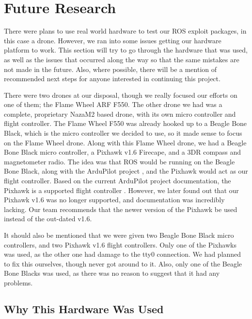 \documentclass[IEEEtran,letterpaper,10pt,notitlepage,draftclsnofoot]{article}
\begin{document}
\section{Future Research}


There were plans to use real world hardware to test our ROS exploit packages, in this case a drone. However,
we ran into some issues getting our hardware platform to work. This section will try to go through the
hardware that was used, as well as the issues that occurred along the way so that the same mistakes are not
made in the future. Also, where possible, there will be a mention of recommended next steps for anyone
interested in continuing this project.

There were two drones at our disposal, though we really focused our efforts on one of them; the Flame Wheel ARF F550. The other drone we had was a complete, proprietary NazaM2 based drone, with its own micro controller
and flight controller. The Flame Wheel F550 was already hooked up to a Beagle Bone Black, which is the
micro controller we decided to use, so it made sense to focus on the Flame Wheel drone. Along with this
Flame Wheel drone, we had a Beagle Bone Black micro controller, a Pixhawk v1.6 Firecape, and a 3DR compass and
magnetometer radio. The idea was that ROS would be running on the Beagle Bone Black, along with the ArduPilot
project \cite{Ardu}, and the Pixhawk would act as our flight controller. Based on the current
ArduPilot project documentation, the Pixhawk is a supported flight controller \cite{ArduFlightController}.
However, we later found out that our Pixhawk v1.6 was no longer supported, and documentation was incredibly
lacking. Our team recommends that the newer version of the Pixhawk be used instead of the out-dated v1.6.

It should also be mentioned that we were given two Beagle Bone Black micro controllers, and two
Pixhawk v1.6 flight controllers. Only one of the Pixhawks was used, as the other one had damage to the
tty0 connection. We had planned to fix this ourselves, though never got around to it. Also, only one of the
Beagle Bone Blacks was used, as there was no reason to suggest that it had any problems.

\subsection{Why This Hardware Was Used}
\end{document}
